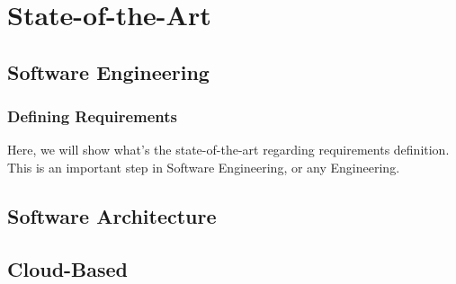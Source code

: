 \chapter{State-of-the-Art}
\label{state-of-the-art}

\section{Software Engineering}
\label{state-of-the-art:s:software-engineering}

\subsection{Defining Requirements}
\label{state-of-the-art:ss:defining-requirements}

Here, we will show what's the state-of-the-art regarding requirements definition. This is an important step in Software Engineering, or any Engineering.

\section{Software Architecture}
\label{state-of-the-art:s:software-architecture}

\section{Cloud-Based}
\label{state-of-the-art:s:cloud-based}